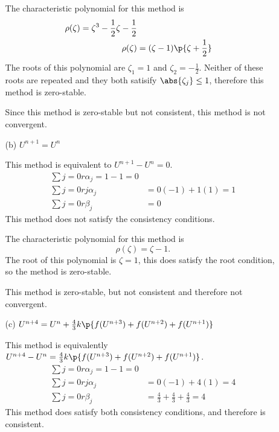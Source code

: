 \documentclass[11pt, oneside, titlepage]{article}
\begin{document}
\begin{enumerate}
\begin{enumerate}
                The characteristic polynomial for this method is
                \begin{align*}
                    \rho(\zeta) = \zeta^3 - \frac{1}{2}\zeta - \frac{1}{2} \\
                    \rho(\zeta) &= (\zeta - 1)\p{\zeta + \frac{1}{2}}
                \end{align*}
                The roots of this polynomial are $\zeta_1 = 1$ and
                $\zeta_2 = -\frac{1}{2}$.
                Neither of these roots are repeated and they both satisify
                $\abs{\zeta_j} \le 1$, therefore this method is zero-stable.

                Since this method is zero-stable but not consistent, this method
                is not convergent.

            \item[(b)] %
                $U^{n+1} = U^n$

                This method is equivalent to $U^{n+1} - U^n = 0$.
                \begin{align*}
                    \sum{j=0}{r}{\alpha_j} = 1 - 1 = 0 \\
                    \sum{j=0}{r}{j\alpha_j} &= 0(-1) + 1(1) = 1 \\
                    \sum{j=0}{r}{\beta_j} &= 0
                \end{align*}
                This method does not satisfy the consistency conditions.

                The characteristic polynomial for this method is
                \[
                    \rho(\zeta) = \zeta - 1.
                \]
                The root of this polynomial is $\zeta = 1$, this does satisfy
                the root condition, so the method is zero-stable.

                This method is zero-stable, but not consistent and therefore
                not convergent.

            \item[(c)] %
                $U^{n+4} = U^n + \frac{4}{3} k \p{f(U^{n+3}) + f(U^{n+2}) + f(U^{n+1})}$

                This method is equivalently
                $U^{n+4} - U^n = \frac{4}{3} k \p{f(U^{n+3}) + f(U^{n+2}) + f(U^{n+1})}$.
                \begin{align*}
                    \sum{j=0}{r}{\alpha_j} = 1 - 1 = 0 \\
                    \sum{j=0}{r}{j\alpha_j} &= 0(-1) + 4(1) = 4 \\
                    \sum{j=0}{r}{\beta_j} &= \frac{4}{3} + \frac{4}{3} + \frac{4}{3} = 4
                \end{align*}
                This method does satisfy both consistency conditions, and
                therefore is consistent.


\end{enumerate}
\end{enumerate}
\end{document}
